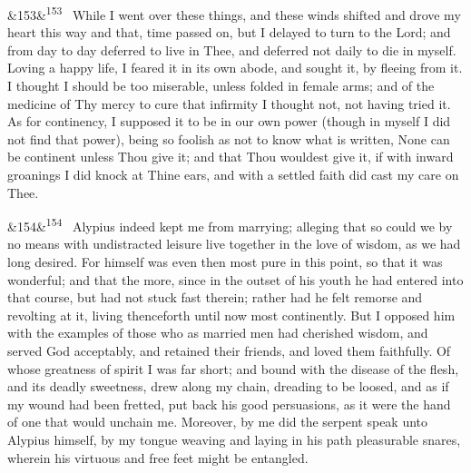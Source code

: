 \documentclass[12pt]{article}
\newcommand{\para}[1][]{\par\noindent\ifx&#1&\else\textsuperscript{\footnotesize #1}~\fi}
\begin{document}
\para[153] While I went over these things, and these winds shifted and drove my heart this way and that, time passed on, but I delayed to turn to the Lord; and from day to day deferred to live in Thee, and deferred not daily to die in myself. Loving a happy life, I feared it in its own abode, and sought it, by fleeing from it. I thought I should be too miserable, unless folded in female arms; and of the medicine of Thy mercy to cure that infirmity I thought not, not having tried it. As for continency, I supposed it to be in our own power (though in myself I did not find that power), being so foolish as not to know what is written, None can be continent unless Thou give it; and that Thou wouldest give it, if with inward groanings I did knock at Thine ears, and with a settled faith did cast my care on Thee.

\para[154] Alypius indeed kept me from marrying; alleging that so could we by no means with undistracted leisure live together in the love of wisdom, as we had long desired. For himself was even then most pure in this point, so that it was wonderful; and that the more, since in the outset of his youth he had entered into that course, but had not stuck fast therein; rather had he felt remorse and revolting at it, living thenceforth until now most continently. But I opposed him with the examples of those who as married men had cherished wisdom, and served God acceptably, and retained their friends, and loved them faithfully. Of whose greatness of spirit I was far short; and bound with the disease of the flesh, and its deadly sweetness, drew along my chain, dreading to be loosed, and as if my wound had been fretted, put back his good persuasions, as it were the hand of one that would unchain me. Moreover, by me did the serpent speak unto Alypius himself, by my tongue weaving and laying in his path pleasurable snares, wherein his virtuous and free feet might be entangled.
\end{document}

